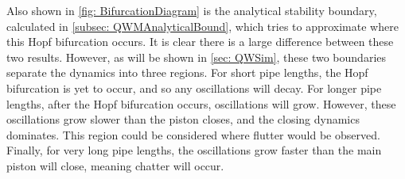 Also shown in \cref{fig: BifurcationDiagram} is the analytical stability boundary, calculated in \cref{subsec: QWMAnalyticalBound}, which tries to approximate where this Hopf bifurcation occurs. It is clear there is a large difference between these two results. However, as will be shown in \cref{sec: QWSim}, these two boundaries separate the dynamics into three %
regions. For short pipe lengths, the Hopf bifurcation is yet to occur, and so any oscillations will decay. For longer pipe lengths, after the Hopf bifurcation occurs, oscillations will grow. However, these oscillations grow slower than the piston closes, and the closing dynamics dominates. This region could be considered where flutter would be observed. Finally, for very long pipe lengths, the oscillations grow faster than the main piston will close, meaning chatter will occur.

